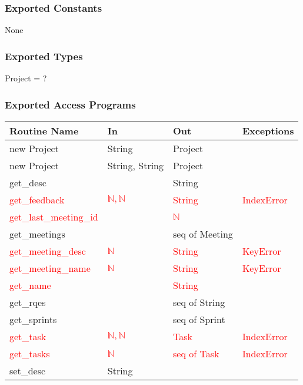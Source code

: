\documentclass[12pt, titlepage]{article}
\begin{document}
\subsubsection* {Exported Constants}
None

\subsubsection* {Exported Types}
Project = ?

\subsubsection* {Exported Access Programs}
\begin{tabular}{|l|l|l|l|}
    \hline
    \textbf{Routine Name} & \textbf{In} & \textbf{Out} & \textbf{Exceptions} \\
    \hline
    new Project & String & Project & \\
    \hline
    new Project & String, String & Project & \\
    \hline
    get\_desc & & String &\\
    \hline
    \textcolor{red}{get\_feedback} & \textcolor{red}{$\mathbb{N,N}$} & \textcolor{red}{String} & \textcolor{red}{IndexError}\\
    \hline
    \textcolor{red}{get\_last\_meeting\_id} & & \textcolor{red}{$\mathbb{N}$}&\\
    \hline
    get\_meetings & & seq of Meeting &\\
    \hline
    \textcolor{red}{get\_meeting\_desc} & \textcolor{red}{$\mathbb{N}$}& \textcolor{red}{String} & \textcolor{red}{KeyError}\\
    \hline
    \textcolor{red}{get\_meeting\_name} & \textcolor{red}{$\mathbb{N}$}& \textcolor{red}{String} & \textcolor{red}{KeyError}\\
    \hline
    \textcolor{red}{get\_name} & & \textcolor{red}{String}&\\
    \hline
    get\_rqes & & seq of String & \\
    \hline
    get\_sprints & & seq of Sprint & \\
    \hline
    \textcolor{red}{get\_task} & \textcolor{red}{$\mathbb{N,N}$} & \textcolor{red}{Task} & \textcolor{red}{IndexError}\\
    \hline
    \textcolor{red}{get\_tasks} & \textcolor{red}{$\mathbb{N}$}& \textcolor{red}{seq of Task} & \textcolor{red}{IndexError}\\
    \hline
    set\_desc & String & &\\

\end{tabular}
\end{document}
